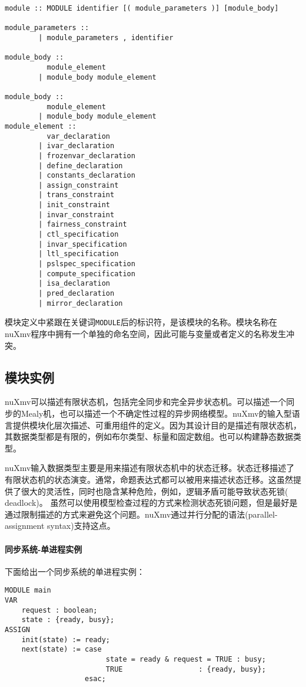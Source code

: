 \begin{lstlisting}
module :: MODULE identifier [( module_parameters )] [module_body]

module_parameters ::
        | module_parameters , identifier

module_body ::
          module_element
        | module_body module_element

module_body ::
          module_element
        | module_body module_element
module_element ::
          var_declaration
        | ivar_declaration
        | frozenvar_declaration
        | define_declaration
        | constants_declaration
        | assign_constraint
        | trans_constraint
        | init_constraint
        | invar_constraint
        | fairness_constraint
        | ctl_specification
        | invar_specification
        | ltl_specification
        | pslspec_specification
        | compute_specification
        | isa_declaration
        | pred_declaration
        | mirror_declaration
\end{lstlisting}

模块定义中紧跟在关键词\verb|MODULE|后的标识符，是该模块的名称。模块名称在nuXmv程序中拥有一个单独的命名空间，因此可能与变量或者定义的名称发生冲突。

\subsection{模块实例}
nuXmv可以描述有限状态机，包括完全同步和完全异步状态机。可以描述一个同步的Mealy机，也可以描述一个不确定性过程的异步网络模型。nuXmv的输入型语言提供模块化层次描述、可重用组件的定义。因为其设计目的是描述有限状态机，其数据类型都是有限的，例如布尔类型、标量和固定数组。也可以构建静态数据类型。

nuXmv输入数据类型主要是用来描述有限状态机中的状态迁移。状态迁移描述了有限状态机的状态演变。通常，命题表达式都可以被用来描述状态迁移。这虽然提供了很大的灵活性，同时也隐含某种危险，例如，逻辑矛盾可能导致状态死锁( deadlock)。 虽然可以使用模型检查过程的方式来检测状态死锁问题，但是最好是通过限制描述的方式来避免这个问题。nuXmv通过并行分配的语法(parallel-assignment syntax)支持这点。

\paragraph{同步系统-单进程实例}
下面给出一个同步系统的单进程实例：
\begin{lstlisting}
MODULE main
VAR
    request : boolean;
    state : {ready, busy};
ASSIGN
    init(state) := ready;
    next(state) := case
                        state = ready & request = TRUE : busy;
                        TRUE                  : {ready, busy};
                   esac;
\end{lstlisting}

